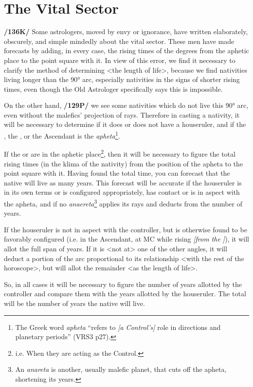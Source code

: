 \section{The Vital Sector}
\textbf{/136K/} Some astrologers, moved by envy or ignorance, have written elaborately, obscurely, and simple mindedly
about the vital sector. These men have made forecasts by adding, in every case, the rising times of the degrees from the aphetic place to the point square with it. In view of this error, we find it necessary to clarify the method of determining <the length of life>, because we find nativities living longer than the 90° arc, especially nativities in the signs of shorter rising times, even though the Old Astrologer specifically says this is impossible. 

On the other hand, \textbf{/129P/} we see some nativities which do not live this 90° arc, even without the malefics’ projection of rays. Therefore in casting a nativity, it will be necessary to determine if it does or does not have a houseruler, and if the \Sun, the \Moon, or the Ascendant is the \textsl{apheta}\footnote{The Greek word \textsl{apheta} ``refers to \textsl{[a Control's]} role in directions and planetary periods'' (VRS3 p27).}. 

If the \Sun\xspace or \Moon\xspace are in the aphetic
place\footnote{i.e. When they are acting as the Control.}, then it will be necessary to figure the total rising times (in the klima of the nativity) from the position of the apheta to the point square with it. Having found the total time, you can forecast that the native will live as many years. This forecast will be accurate if the houseruler is in its own terms or is configured appropriately, has contact or is in aspect with the apheta, and if no \textsl{anaereta}\footnote{An \textsl{anareta} is another, usually malefic planet, that cuts off the apheta, shortening its years. } applies its rays and deducts from the number of years. 

If the houseruler is not in aspect with the controller, but is otherwise found to be favorably configured (i.e. in the Ascendant, at MC while rising \textsl{[from the \Sun]}), it will allot the full span of years. If it is <not at> one of the other angles, it will deduct a portion of the arc proportional to its relationship <with the rest of the horoscope>, but will allot the remainder <as the length of life>.

So, in all cases it will be necessary to figure the number of years allotted by the controller and compare them with the years allotted by the houseruler. The total will be the number of years the native will live.

